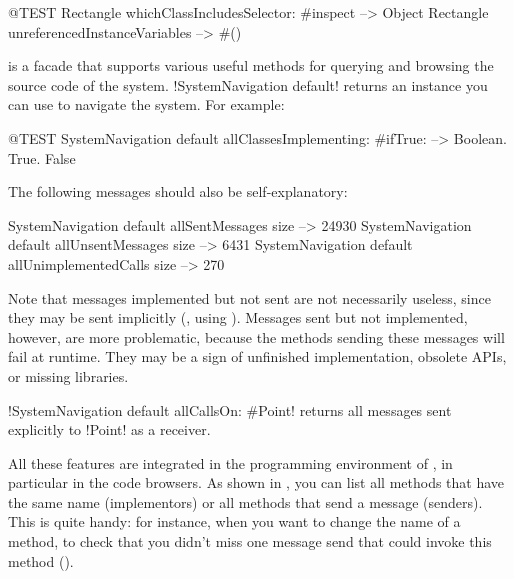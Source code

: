 \documentclass[a4paper,10pt,twoside]{book}
\begin{document}
\begin{code}{@TEST}
Rectangle whichClassIncludesSelector: #inspect --> Object
Rectangle unreferencedInstanceVariables            --> #()
\end{code}

 is a facade that supports various useful methods for querying and browsing the source code of the system.
\ct!SystemNavigation default! returns an instance you can use to navigate the system.
For example:

\begin{code}{@TEST}
SystemNavigation default allClassesImplementing: #ifTrue: --> {Boolean. True. False}
\end{code}


The following messages should also be self-explanatory:

\begin{code}{}
SystemNavigation default allSentMessages size          --> 24930
SystemNavigation default allUnsentMessages size      --> 6431
SystemNavigation default allUnimplementedCalls size --> 270
\end{code}

Note that messages implemented but not sent are not necessarily useless, since they may be sent implicitly (\eg, using ).
Messages sent but not implemented, however, are more problematic, because the methods sending these messages will fail at runtime.
They may be a sign of unfinished implementation, obsolete APIs, or missing libraries.







\ct!SystemNavigation default allCallsOn: #Point! returns all messages sent explicitly to \ct!Point! as a receiver.



All these features are integrated in the programming environment of \squeak, in particular in the code browsers.
As shown in , you can list all methods that have the same name (implementors) or all methods that send a message (senders).
This is quite handy: for instance, when you want to change the name of a method, to check that you didn't miss one message send that could invoke this method (). 
\end{document}
